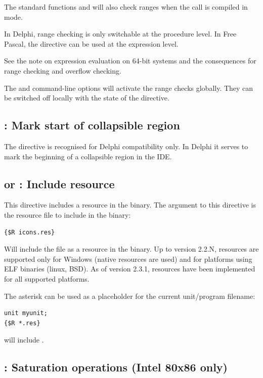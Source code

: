 \begin{remark}The standard functions  and  will also check ranges
when the call is compiled in  mode.
\end{remark}

In Delphi, range checking is only switchable at the procedure level. 
In Free Pascal, the  directive can be used at the expression level.

\begin{remark}
See the note on expression evaluation on 64-bit systems and the consequences
for range checking and overflow checking.
\end{remark}
\begin{remark}
The  and  command-line options will activate the range
checks globally. They can be switched off locally with the  state
of the directive.
\end{remark}

\subsection{ : Mark start of collapsible region}
The  directive is recognised for Delphi compatibility only.
In Delphi it serves to mark the beginning of a collapsible region in the
IDE.

\subsection{ or  : Include resource}
This directive includes a resource in the binary. 
The argument to this directive is the resource file to include in the binary:
\begin{verbatim}
{$R icons.res}
\end{verbatim}
Will include the file  as a resource in the binary. Up to
version 2.2.N, resources are supported only for Windows (native resources are used) 
and for platforms using ELF binaries (linux, BSD). As of version 2.3.1,
resources have been implemented for all supported platforms.

The asterisk can be used as a placeholder for the current unit/program filename:
\begin{verbatim}
unit myunit;
{$R *.res}
\end{verbatim}
will include .

\subsection{ : Saturation operations (Intel 80x86 only)}

